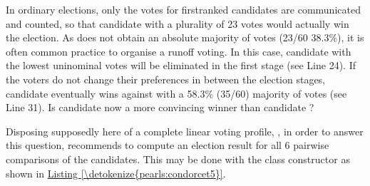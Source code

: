 \documentclass[a4paper,12pt,english]{sphinxhowto}
\begin{document}
\sphinxAtStartPar
In ordinary elections, only the votes for first\sphinxhyphen{}ranked candidates are communicated and counted, so that candidate  with a plurality of 23 votes would actually win the election. As  does not obtain an absolute majority of votes (23/60 38.3\%), it is often common practice to organise a runoff voting. In this case, candidate  with the lowest uninominal votes will be eliminated in the first stage (see Line 24). If the voters do not change their preferences in between the election stages, candidate  eventually wins against  with a  58.3\% (35/60) majority of votes (see Line 31). Is candidate  now a more convincing winner than candidate  ?

\sphinxAtStartPar
Disposing supposedly here of a complete linear voting profile, , in order to answer this question, recommends to compute an election result for all 6 pairwise comparisons of the candidates. This may be done with the  class constructor as shown in \hyperref[\detokenize{pearls:condorcet5}]{Listing \ref{\detokenize{pearls:condorcet5}}}.
\def\sphinxLiteralBlockLabel{\label{\detokenize{pearls:condorcet5}}}
%
\begin{sphinxVerbatim}[commandchars=\\\{\},numbers=left,firstnumber=1,stepnumber=1]
  \PYGZbs{}
               
  
\end{sphinxVerbatim}
\sphinxresetverbatimhllines
\end{document}
